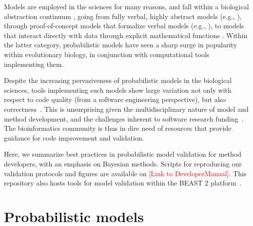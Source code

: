 \documentclass[oneside]{article}
\begin{document}
Models are employed in the sciences for many reasons, and fall within a biological abstraction continuum \citep{servedio14}, going from fully verbal, highly abstract models (e.g., \citealt{vanvalen73}), through proof-of-concept models that formalize verbal models (e.g., \citealt{maynard78,reinhold99,mendes18}), to models that interact directly with data through explicit mathematical functions \citep{yule24,felsenstein73,hky,hudson90}. 
Within the latter category, probabilistic models have seen a sharp surge in popularity within evolutionary biology, in conjunction with computational tools implementing them.

Despite the increasing pervasiveness of probabilistic models in the biological sciences, tools implementing such models show large variation not only with respect to code quality (from a software engineering perspective), but also correctness~\citep{darriba18}.
This is unsurprising given the multidisciplinary nature of model and method development, and the challenges inherent to software research funding~\citep{siepel19}.
The bioinformatics community is thus in dire need of resources that provide guidance for code improvement and validation.

Here, we summarize best practices in probabilistic model validation for method developers, with an emphasis on Bayesian methods.
Scripts for reproducing our validation protocols and figures are available on \textcolor{red}{[Link to DeveloperManual]}.
This repository also hosts tools for model validation within the BEAST 2 platform~\citep{beast25}.



\section*{Probabilistic models}
\label{sec:prob_models}
\end{document}

